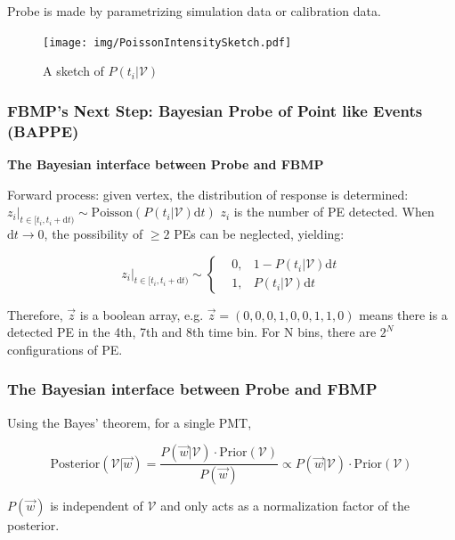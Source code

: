 \documentclass{beamer}
\newcommand{\dd}{\mathrm{d}}
\begin{document}
\begin{CJK*}{UTF8}{gbsn}
\begin{frame}
    Probe is made by parametrizing simulation data or calibration data. \cite{lin_fast_2016}

    \begin{figure}[H]
        \centering
            \texttt{[image: img/PoissonIntensitySketch.pdf]}
        \caption{A sketch of $P(t_i|\mathcal{V})$}
        \label{fig:1}
    \end{figure}
\end{frame}

\begin{frame}
    \frametitle{FBMP's Next Step: Bayesian Probe of Point like Events (BAPPE)}
    \textbf{The Bayesian interface between Probe and FBMP}

    Forward process: given vertex, the distribution of response is determined: $z_i|_{t\in[t_i,t_i+\dd t)} \sim \mathrm{Poisson}(P(t_i|\mathcal{V}) \dd t)$ $z_i$ is the number of PE detected. When $\dd t \rightarrow 0$, the possibility of $\geqslant 2$ PEs can be neglected, yielding:

    \begin{equation}
        z_i|_{t\in[t_i,t_i+\dd t)} \sim \left\{ 
            \begin{aligned}
                & 0, & 1-P(t_i|\mathcal{V}) \dd t \\
                & 1, & P(t_i|\mathcal{V}) \dd t
            \end{aligned}
        \right.
        \label{eq:1}
    \end{equation}

    Therefore, $\vec{z}$ is a boolean array, e.g. $\vec{z} = (0,0,0,1,0,0,1,1,0)$ means there is a detected PE in the 4th, 7th and 8th time bin. For N bins, there are $2^N$ configurations of PE.
\end{frame}

\begin{frame}
    \frametitle{The Bayesian interface between Probe and FBMP}

    Using the Bayes' theorem, for a single PMT, 

    \begin{equation}
        \mathrm{Posterior}(\mathcal{V}|\vec{w}) = \frac{P(\vec{w}|\mathcal{V}) \cdot \mathrm{Prior}(\mathcal{V})}  {P(\vec{w})} \propto P(\vec{w}|\mathcal{V}) \cdot \mathrm{Prior}(\mathcal{V})
        \label{eq:2}
    \end{equation}
    
   $P(\vec{w})$ is independent of $\mathcal{V}$ and only acts as a normalization factor of the posterior.


\end{frame}
\end{CJK*}
\end{document}

